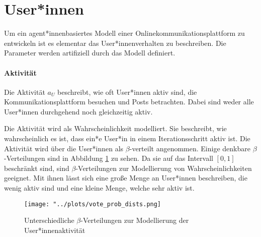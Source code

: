 


\section{User*innen}


Um ein agent*innenbasiertes Modell einer Onlinekommunikationsplattform zu entwickeln ist es elementar das User*innenverhalten zu beschreiben. Die Parameter werden artifiziell durch das Modell definiert.

\paragraph{Aktivität}


Die Aktivität $a_U$ beschreibt, wie oft User*innen aktiv sind, die Kommunikationsplattform besuchen und Posts betrachten. Dabei sind weder alle User*innen durchgehend noch gleichzeitig aktiv.  

Die Aktivität wird als Wahrscheinlichkeit modelliert. Sie beschreibt, wie wahrscheinlich es ist, dass ein*e User*in in einem Iterationsschritt aktiv ist. Die Aktivität wird über die User*innen als $\beta$-verteilt angenommen. Einige denkbare $\beta$-Verteilungen sind in Abbildung \ref{fig:betas} zu sehen. Da sie auf das Intervall $[0,1]$ beschränkt sind, sind $\beta$-Verteilungen zur Modellierung von Wahrscheinlichkeiten geeignet. Mit ihnen lässt sich eine große Menge an User*innen beschreiben, die wenig aktiv sind und eine kleine Menge, welche sehr aktiv ist.

\begin{figure}[!h]
	\texttt{[image: "../plots/vote\_prob\_dists.png]}
	\caption{Unterschiedliche $\beta$-Verteilungen zur Modellierung der User*innenaktivität}
	\label{fig:betas}
\end{figure}

